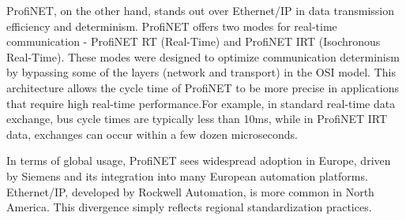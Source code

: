\documentclass[conference]{IEEEtran}
\begin{document}
ProfiNET, on the other hand, stands out over Ethernet/IP in data transmission efficiency and determinism. ProfiNET offers two modes for real-time communication - ProfiNET RT (Real-Time) and ProfiNET IRT (Isochronous Real-Time). These modes were designed to optimize communication determinism by bypassing some of the layers (network and transport) in the OSI model\cite{ProfinetCommunicationChannels}. This architecture allows the cycle time of ProfiNET to be more precise in applications that require high real-time performance.For example, in standard real-time data exchange,  bus cycle times are typically less than 10ms, while in ProfiNET IRT data, exchanges can occur within a few dozen microseconds\cite{Eitel2020EtherNetVsPROFINET}.

In terms of global usage, ProfiNET sees widespread adoption in Europe, driven by Siemens and its integration into many European automation platforms. Ethernet/IP, developed by Rockwell Automation, is more common in North America. This divergence simply reflects regional standardization practices.
\end{document}
